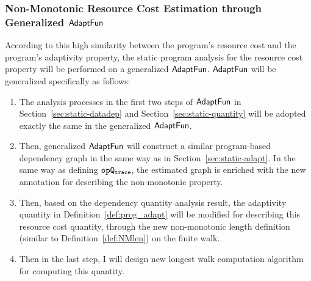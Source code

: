 \subsubsection{Non-Monotonic Resource Cost Estimation through Generalized $\textsf{AdaptFun}$}
According to this high similarity between the program's resource cost and the 
program's adaptivity property, the static program analysis for the resource cost property will 
be performed on a generalized $\textsf{AdaptFun}$. $\textsf{AdaptFun}$ will be generalized specifically as follows:
\begin{enumerate}
 \item The analysis processes in the first two steps of $\textsf{AdaptFun}$ in Section~\ref{sec:static-datadep}
 and Section~\ref{sec:static-quantity} will be adopted exactly the same in the generalized $\textsf{AdaptFun}$.
 \item Then, generalized $\textsf{AdaptFun}$ will construct a similar program-based dependency graph 
 in the same way as in Section~\ref{sec:static-adapt}. In the same way as defining $\mathtt{opQ_{trace}}$, 
 the estimated graph is enriched with the new annotation for describing the non-monotonic property.
 \item Then, based on the dependency quantity analysis result, the adaptivity quantity in Definition~\ref{def:prog_adapt}
 will be modified for describing this resource cost quantity, through the new non-monotonic length definition (similar to Definition~\ref{def:NMlen}) on the finite walk.
 \item Then in the last step, I will design new longest walk computation algorithm for computing this quantity.
\end{enumerate}

